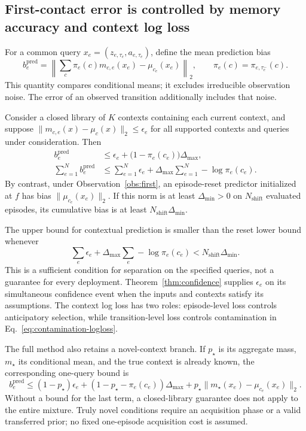 

\subsection{First-contact error is controlled by memory accuracy and context log loss}
\label{sec:firstcontact-theory}
For a common query $x_e=(z_{e,\tau_e},a_{e,\tau_e})$, define the mean prediction bias
\[
 b_e^{\mathrm{pred}}=\left\|\sum_c\pi_e(c)m_{c,e}(x_e)-\mu_{c_e}(x_e)\right\|_2,
 \qquad \pi_e(c)=\pi_{e,\tau_e^-}(c).
\]
This quantity compares conditional means; it excludes irreducible observation noise. The error of an observed transition additionally includes that noise.

\begin{proposition}\label{prop:firstbound}
Consider a closed library of $K$ contexts containing each current context, and suppose
$\|m_{c,e}(x)-\mu_c(x)\|_2\leq\epsilon_e$ for all supported contexts and queries under consideration. Then
\begin{align}
 b_e^{\mathrm{pred}}&\leq\epsilon_e+
          \bigl(1-\pi_e(c_e)\bigr)\Delta_{\max},\label{eq:firstbound}\\
 \sum_{e=1}^N b_e^{\mathrm{pred}}
 &\leq\sum_{e=1}^N\epsilon_e+
       \Delta_{\max}\sum_{e=1}^N-\log\pi_e(c_e).\label{eq:firstlogloss}
\end{align}
By contrast, under Observation~\ref{obs:first}, an episode-reset predictor initialized at $f$ has bias $\|\mu_{c_e}(x_e)\|_2$. If this norm is at least $\Delta_{\min}>0$ on $N_{\mathrm{shift}}$ evaluated episodes, its cumulative bias is at least $N_{\mathrm{shift}}\Delta_{\min}$.
\end{proposition}
The upper bound for contextual prediction is smaller than the reset lower bound whenever
\begin{equation}\label{eq:separationcondition}
 \sum_e\epsilon_e+\Delta_{\max}\sum_e-\log\pi_e(c_e)
 <N_{\mathrm{shift}}\Delta_{\min}.
\end{equation}
This is a sufficient condition for separation on the specified queries, not a guarantee for every deployment. Theorem~\ref{thm:confidence} supplies $\epsilon_e$ on its simultaneous confidence event when the inputs and contexts satisfy its assumptions. The context log loss has two roles: episode-level loss controls anticipatory selection, while transition-level loss controls contamination in Eq.~\eqref{eq:contamination-logloss}.

The full method also retains a novel-context branch. If $p_\star$ is its aggregate mass, $m_\star$ its conditional mean, and the true context is already known, the corresponding one-query bound is
\begin{equation}\label{eq:novelbranchbound}
 b_e^{\mathrm{pred}}\leq(1-p_\star)\epsilon_e+
 (1-p_\star-\pi_e(c_e))\Delta_{\max}
 +p_\star\|m_\star(x_e)-\mu_{c_e}(x_e)\|_2.
\end{equation}
Without a bound for the last term, a closed-library guarantee does not apply to the entire mixture. Truly novel conditions require an acquisition phase or a valid transferred prior; no fixed one-episode acquisition cost is assumed.

